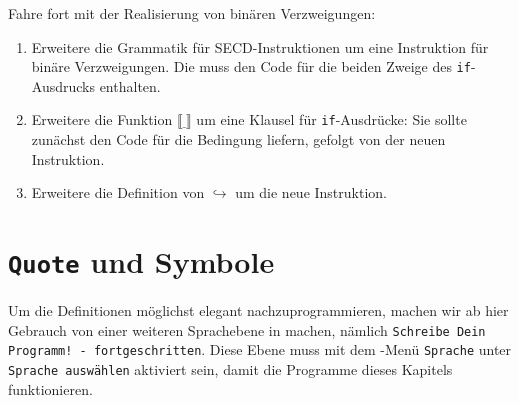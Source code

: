 \begin{aufgabeinline}
  Fahre fort mit der Realisierung von binären Verzweigungen:
  \begin{enumerate}
  \item Erweitere die Grammatik für SECD-Instruktionen um eine
    Instruktion für binäre Verzweigungen.  Die muss den Code für die
    beiden Zweige des \lstinline{if}-Ausdrucks enthalten.
  \item Erweitere die Funktion $\llbracket \underline{~}\rrbracket$
    um eine Klausel für \lstinline{if}-Ausdrücke: Sie sollte zunächst
    den Code für die Bedingung liefern, gefolgt von der neuen
    Instruktion.
  \item Erweitere die Definition von $\hookrightarrow$ um die neue
    Instruktion.
  \end{enumerate}
\end{aufgabeinline}

\section{\texttt{Quote} und Symbole}
\label{sec:quote}

%
Um die Definitionen möglichst elegant nachzuprogrammieren, machen wir ab hier
Gebrauch von einer weiteren
Sprachebene in
\drscheme{} machen, nämlich \texttt{Schreibe Dein Programm! -
  fortgeschritten}.  Diese Ebene muss mit dem \drscheme{}-Menü \texttt{Sprache}
unter \texttt{Sprache auswählen} aktiviert sein, damit die
Programme dieses Kapitels funktionieren.

